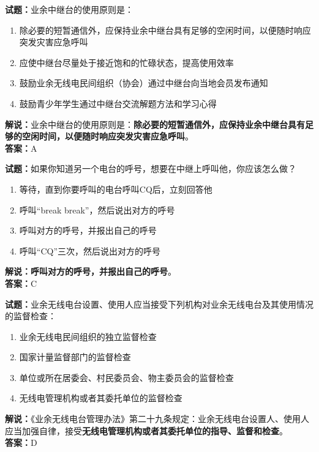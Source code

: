 \documentclass{ctexbook}
\begin{document}


\bigskip


\noindent\textbf{试题：}业余中继台的使用原则是：
\begin{enumerate}[leftmargin=3em]
	\item 除必要的短暂通信外，应保持业余中继台具有足够的空闲时间，以便随时响应突发灾害应急呼叫
	\item 应使中继台尽量处于接近饱和的忙碌状态，提高使用效率
	\item 鼓励业余无线电民间组织（协会）通过中继台向当地会员发布通知
	\item 鼓励青少年学生通过中继台交流解题方法和学习心得
\end{enumerate}
\noindent\textbf{解说：}业余中继台的使用原则是：\textbf{除必要的短暂通信外，应保持业余中继台具有足够的空闲时间，以便随时响应突发灾害应急呼叫}。\\\noindent\textbf{答案：}A



\bigskip


\noindent\textbf{试题：}如果你知道另一个电台的呼号，想要在中继上呼叫他，你应该怎么做？
\begin{enumerate}[leftmargin=3em]
	\item 等待，直到你要呼叫的电台呼叫CQ后，立刻回答他
	\item 呼叫“break break”，然后说出对方的呼号
	\item 呼叫对方的呼号，并报出自己的呼号
	\item 呼叫“CQ”三次，然后说出对方的呼号
\end{enumerate}
\noindent\textbf{解说：}\textbf{呼叫对方的呼号，并报出自己的呼号}。\\\noindent\textbf{答案：}C



\bigskip


\noindent\textbf{试题：}业余无线电台设置、使用人应当接受下列机构对业余无线电台及其使用情况的监督检查：
\begin{enumerate}[leftmargin=3em]
	\item 业余无线电民间组织的独立监督检查
	\item 国家计量监督部门的监督检查
	\item 单位或所在居委会、村民委员会、物主委员会的监督检查
	\item 无线电管理机构或者其委托单位的监督检查
\end{enumerate}
\noindent\textbf{解说：}《业余无线电台管理办法》第二十九条规定：业余无线电台设置人、使用人应当加强自律，接受\textbf{无线电管理机构或者其委托单位的指导、监督和检查}。\\\noindent\textbf{答案：}D
\end{document}
